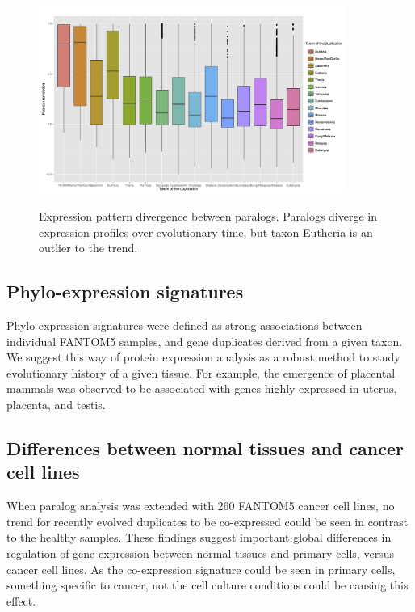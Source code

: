 \documentclass[11pt, a4paper,oneside]{report}
\begin{document}
\begin{figure}[t]
\begin{center}
\label{img:populations}
\includegraphics[width=0.9\textwidth]{figures/fantom_eutheria.png}
\end{center}
\caption{Expression pattern divergence between paralogs.
Paralogs diverge in expression profiles over evolutionary time, but taxon Eutheria is an outlier to the trend.} 
\end{figure}

\subsection{Phylo-expression signatures}
Phylo-expression signatures were defined as strong associations between individual FANTOM5 samples, and gene duplicates derived from a given taxon. We suggest this way of protein expression analysis as a robust method to study evolutionary history of a given tissue. For example, the emergence of placental mammals was observed to be associated with genes highly expressed in uterus, placenta, and testis.

\subsection{Differences between normal tissues and cancer cell lines}
When paralog analysis was extended with 260 FANTOM5 cancer cell lines, no trend for recently evolved duplicates to be co-expressed could be seen in contrast to the healthy samples. These findings suggest important global differences in regulation of gene expression between normal tissues and primary cells, versus cancer cell lines. As the co-expression signature could be seen in primary cells, something specific to cancer, not the cell culture conditions could be causing this effect.
\end{document}
